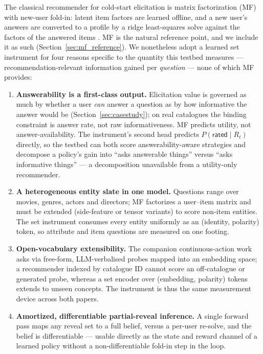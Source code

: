 \documentclass[11pt]{article}
\begin{document}
The classical recommender for cold-start elicitation is matrix
factorization (MF) with new-user fold-in: latent item factors are learned
offline, and a new user's answers are converted to a profile by a ridge
least-squares solve against the factors of the answered items
\citep{golbandi2011adaptive, zhou2011functional}. MF is the natural
reference point, and we include it as such (Section~\ref{sec:mf_reference}).
We nonetheless adopt a learned set instrument for four reasons specific to
the quantity this testbed measures --- recommendation-relevant information
gained per \emph{question} --- none of which MF provides:

\begin{enumerate}
  \item \textbf{Answerability is a first-class output.} Elicitation value
  is governed as much by whether a user \emph{can} answer a question as by
  how informative the answer would be (Section~\ref{sec:casestudy}); on
  real catalogues the binding constraint is answer rate, not raw
  informativeness. MF predicts utility, not answer-availability. The
  instrument's second head predicts $P(\textsf{rated}\mid R_t)$ directly,
  so the testbed can both score answerability-aware strategies and
  decompose a policy's gain into ``asks answerable things'' versus ``asks
  informative things'' --- a decomposition unavailable from a utility-only
  recommender.
  \item \textbf{A heterogeneous entity slate in one model.} Questions range
  over movies, genres, actors and directors; MF factorizes a user--item
  matrix and must be extended (side-feature or tensor variants) to score
  non-item entities. The set instrument consumes every entity uniformly as
  an (identity, polarity) token, so attribute and item questions are
  measured on one footing.
  \item \textbf{Open-vocabulary extensibility.} The companion
  continuous-action work asks via free-form, LLM-verbalised probes mapped
  into an embedding space; a recommender indexed by catalogue ID cannot
  score an off-catalogue or generated probe, whereas a set encoder over
  (embedding, polarity) tokens extends to unseen concepts. The instrument
  is thus the same measurement device across both papers.
  \item \textbf{Amortized, differentiable partial-reveal inference.} A
  single forward pass maps any reveal set to a full belief, versus a
  per-user re-solve, and the belief is differentiable --- usable directly
  as the state and reward channel of a learned policy without a
  non-differentiable fold-in step in the loop.
\end{enumerate}
\end{document}
